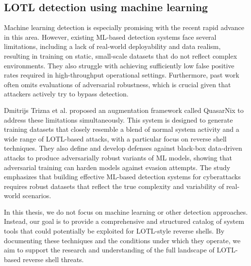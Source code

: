 
\subsection*{LOTL detection using machine learning}

Machine learning detection is especially promising with the recent rapid advance in this area. However, existing ML-based detection systems face several limitations, including a lack of real-world deployability and data realism, resulting in training on static, small-scale datasets that do not reflect complex environments. They also struggle with achieving sufficiently low false positive rates required in high-throughput operational settings. Furthermore, past work often omits evaluations of adversarial robustness, which is crucial given that attackers actively try to bypass detection.

Dmitrijs Trizna et al. proposed an augmentation framework called QuasarNix \cite{LOTL} to address these limitations simultaneously. This system is designed to generate training datasets that closely resemble a blend of normal system activity and a wide range of LOTL-based attacks, with a particular focus on reverse shell techniques. They also define and develop defenses against black-box data-driven attacks to produce adversarially robust variants of ML models, showing that adversarial training can harden models against evasion attempts. The study emphasizes that building effective ML-based detection systems for cyberattacks requires robust datasets that reflect the true complexity and variability of real-world scenarios.

In this thesis, we do not focus on machine learning or other detection approaches. Instead, our goal is to provide a comprehensive and structured catalog of system tools that could potentially be exploited for LOTL-style reverse shells. By documenting these techniques and the conditions under which they operate, we aim to support the research and understanding of the full landscape of LOTL-based reverse shell threats.
